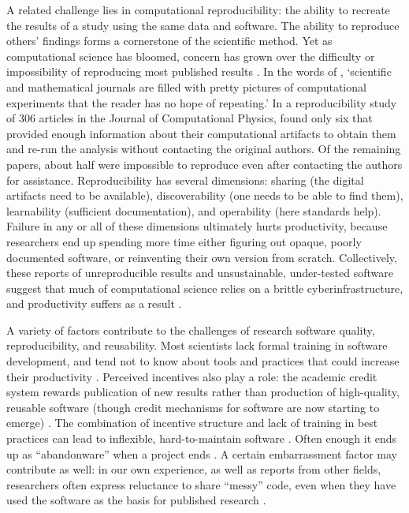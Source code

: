 \documentclass[12pt]{amsart}
\begin{document}
A related challenge lies in computational reproducibility: the ability to recreate the results of a study using the same data and software. The ability to reproduce others' findings forms a cornerstone of the scientific method. Yet as computational science has bloomed, concern has grown over the difficulty or impossibility of reproducing most published results \citep[e.g.,][]{schwab2000making,peng2011reproducible,stodden2013setting,barba2016hard,alnoamany2018towards,chen2019open,krafczyk2019scientific}. In the words of \citet{leveque2009python}, `scientific and mathematical journals are filled with pretty pictures of computational experiments that the reader has no hope of repeating.' In a reproducibility study of 306 articles in the Journal of Computational Physics, \citet{stodden2018enabling} found only six that provided enough information about their computational artifacts to obtain them and re-run the analysis without contacting the original authors. Of the remaining papers, about half were impossible to reproduce even after contacting the authors for assistance. Reproducibility has several dimensions: sharing (the digital artifacts need to be available), discoverability (one needs to be able to find them), learnability (sufficient documentation), and operability (here standards help). Failure in any or all of these dimensions ultimately hurts productivity, because researchers end up spending more time either figuring out opaque, poorly documented software, or reinventing their own version from scratch. Collectively, these reports of unreproducible results and unsustainable, under-tested software suggest that much of computational science relies on a brittle cyberinfrastructure, and productivity suffers as a result \citep{wilson2006s,faulk2009scientific,prabhu2011survey}.

A variety of factors contribute to the challenges of research software quality, reproducibility, and reusability. Most scientists lack formal training in software development, and tend not to know about tools and practices that could increase their productivity \citep{kelly2007software,basili2008understanding,faulk2009scientific,hannay2009scientists,hwang2017software,alnoamany2018towards,pinto2018scientists,kellogg2018role}. Perceived incentives also play a role: the academic credit system rewards publication of new results rather than production of high-quality, reusable software (though credit mechanisms for software are now starting to emerge) \citep{leveque2009python,howison2011scientific,morin2012shining,turk2013scaling,ahalt2014water,poisot2015best,hwang2017software,wiese2019naming}. The combination of incentive structure and lack of training in best practices can lead to inflexible, hard-to-maintain software \citep{brown2014run,johanson2018software}. Often enough it ends up as ``abandonware'' when a project ends \citep{barnes2010publish}. A certain embarrassment factor may contribute as well: in our own experience, as well as reports from other fields, researchers often express reluctance to share ``messy'' code, even when they have used the software as the basis for published research \citep{barnes2010publish,morin2012shining,leveque2013top}.
\end{document}
